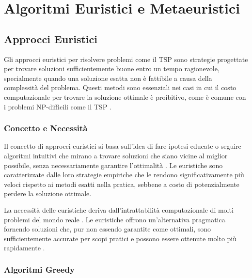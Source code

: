 
%

\chapter{Algoritmi Euristici e Metaeuristici}\label{chapt:4}
\section{Approcci Euristici}

Gli approcci euristici per risolvere problemi come il \Gls{TSP} sono strategie progettate per trovare soluzioni sufficientemente buone entro un tempo ragionevole, specialmente quando una soluzione esatta non è fattibile a causa della complessità \cite{Johnson2002} del problema. Questi metodi sono essenziali nei casi in cui il costo computazionale per trovare la soluzione ottimale è proibitivo, come è comune con i problemi NP-difficili come il \Gls{TSP} \cite{Cormen2009}.

\subsection{Concetto e Necessità}
Il concetto di approcci euristici si basa sull'idea di fare ipotesi educate o seguire algoritmi intuitivi che mirano a trovare soluzioni che siano vicine al miglior possibile, senza necessariamente garantire l'ottimalità \cite{Papadimitriou1998}. Le euristiche sono caratterizzate dalle loro strategie empiriche che le rendono significativamente più veloci rispetto ai metodi esatti nella pratica, sebbene a costo di potenzialmente perdere la soluzione ottimale.

La necessità delle euristiche deriva dall'intrattabilità computazionale di molti problemi del mondo reale \cite{Lawler1985}. Le euristiche offrono un'alternativa pragmatica fornendo soluzioni che, pur non essendo garantite come ottimali, sono sufficientemente accurate per scopi pratici e possono essere ottenute molto più rapidamente \cite{Aarts1989}.

\subsection{Algoritmi Greedy}

